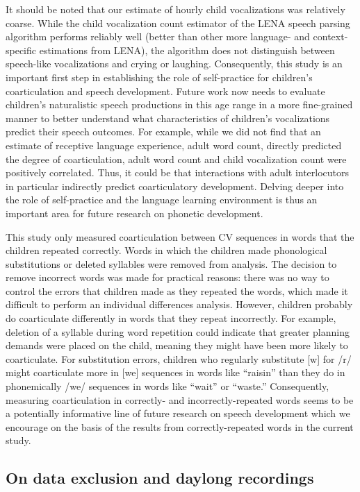 \documentclass[a4paper,man,natbib,donotrepeattitle, apacite]{apa6}
\begin{document}
It should be noted that our estimate of hourly child vocalizations was relatively coarse. While the child vocalization count estimator of the LENA speech parsing algorithm performs reliably well \cite{cristiaThoroughEvaluationLanguage2020} (better than other more language- and context-specific estimations from LENA), the algorithm does not distinguish between speech-like vocalizations and crying or laughing. Consequently, this study is an important first step in establishing the role of self-practice for children’s coarticulation and speech development. Future work now needs to evaluate children’s naturalistic speech productions in this age range in a more fine-grained manner to better understand what characteristics of children’s vocalizations predict their speech outcomes. For example, while we did not find that an estimate of receptive language experience, adult word count, directly predicted the degree of coarticulation, adult word count and child vocalization count were positively correlated. Thus, it could be that interactions with adult interlocutors in particular indirectly predict coarticulatory development. Delving deeper into the role of self-practice and the language learning environment is thus an important area for future research on phonetic development. 

This study only measured coarticulation between CV sequences in words that the children repeated correctly. Words in which the children made phonological substitutions or deleted syllables were removed from analysis. The decision to remove incorrect words was made for practical reasons: there was no way to control the errors that children made as they repeated the words, which made it difficult to perform an individual differences analysis. However, children probably do coarticulate differently in words that they repeat incorrectly. For example, deletion of a syllable during word repetition could indicate that greater planning demands were placed on the child, meaning they might have been more likely to coarticulate. For substitution errors, children who regularly substitute [w] for /r/ might coarticulate more in [we] sequences in words like ``raisin'' than they do in phonemically /we/ sequences in words like ``wait'' or ``waste.'' Consequently, measuring coarticulation in correctly- and incorrectly-repeated words seems to be a potentially informative line of future research on speech development which we encourage on the basis of the results from correctly-repeated words in the current study. 

\subsection{On data exclusion and daylong recordings}
\end{document}
